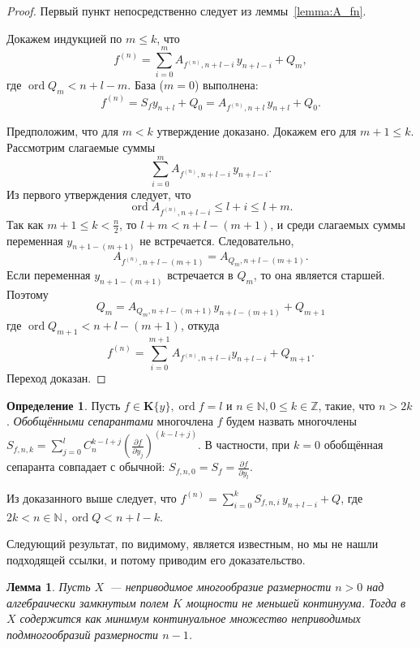 \documentclass[16pt]{article}
\DeclareMathOperator{\ord}{ord}
\renewcommand{\le}{\leqslant} %
\theoremstyle{plain1}
\newtheorem{lemma}[theorem1]{Лемма}
\theoremstyle{plain2}
\theoremstyle{plain}
\theoremstyle{plain3}
\theoremstyle{definition}
\newtheorem{definition}[theorem2]{Определение}
\theoremstyle{remark}
\begin{document}
\begin{proof} Первый пункт непосредственно следует из леммы~\ref{lemma:A_fn}.

Докажем индукцией по $m\le k$, что
$$
f^{(n)}=\sum\limits_{i=0}^{m} A_{f^{(n)},n+l -i} \, y_{n+l -i} + Q_m,
$$
где $\ord Q_m < n+l-m$. База ($m = 0$) выполнена:
$$
 f^{(n)}=S_fy_{n+l}+Q_0=A_{f^{(n)}, n + l} \, y_{n+l} +Q_0.
$$

Предположим, что для $m<k$ утверждение доказано. Докажем его для $m+1\le k$.
Рассмотрим слагаемые суммы
$$
 \sum\limits_{i=0}^{m} A_{f^{(n)},n+l -i} \, y_{n+l -i}.
$$
Из первого утверждения следует, что
$$
\ord A_{f^{(n)},n+l -i}\le l+i\le l+m.
$$
Так как $m+1 \le k < \frac{n}{2}$, то $l+m < n+l-(m+1)$, 
и среди слагаемых суммы переменная $y_{n+1-(m+1)}$ не встречается.
Следовательно,
$$
A_{f^{(n)}, n+l-(m+1)} = A_{Q_{m}, n+l-(m+1)}.
$$
Если переменная $y_{n+1-(m+1)}$ встречается в $Q_m$, то она является старшей.
Поэтому
$$
 Q_{m}=A_{Q_{m}, n+l-(m+1)}y_{n+l-(m+1)}+Q_{m+1}
$$
где $\ord Q_{m+1}<n+l-(m+1)$,
откуда
$$
f^{(n)}=\sum\limits_{i=0}^{m+1} A_{f^{(n)},n+l-i}y_{n+l-i} + Q_{m+1}.
$$
Переход доказан.
\end{proof}
\begin{definition}
Пусть $f\in\mathbf{K}\{y\},\ord f=l$  и $n\in\mathbb{N},0\le k\in\mathbb{Z}$, такие, что $n>2k$. \emph{Обобщёнными сепарантами} многочлена $f$ будем назвать многочлены $S_{f,n,k}=\sum\limits_{j=0}^{l}C_n^{k - l + j
}\left(\frac{\partial f}{\partial y_j}\right)^{(k - l + j)}$. В частности, при $k=0$ обобщённая сепаранта совпадает с обычной: $S_{f,n,0}=S_f = \frac{\partial f}{\partial y_l}$. 
\end{definition}
Из доказанного выше следует, что $f^{(n)}= \sum\limits_{i=0}^{k} S_{f,n,i} \, y_{n+l -i}+ Q$, где $2k<n\in\mathbb{N}\,,\ord Q < n+l-k$.

\bigskip

Следующий результат, по видимому, является известным, но мы не нашли
подходящей ссылки, и потому приводим его доказательство.

\begin{lemma} \label{lemma:sb_vr_cntm}
Пусть $X$~--- неприводимое многообразие размерности $n > 0$ над алгебраически замкнутым полем $K$
мощности не меньшей континуума. Тогда в
$X$ содержится как минимум континуальное множество
неприводимых подмногообразий размерности $n-1$.
\end{lemma}
\end{document}
